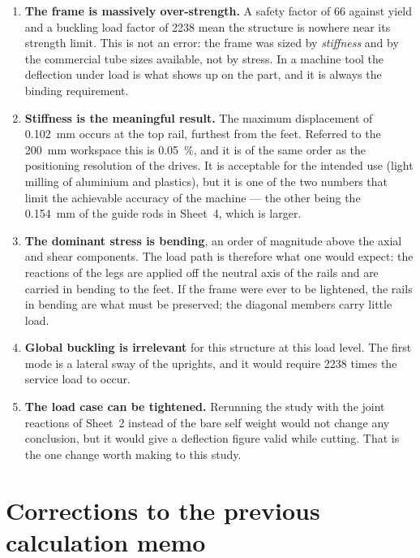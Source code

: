 \documentclass[11pt]{article}
\def\calculo{ }
\def\nombre{Group 2}
\newcommand{\sheet}[2]{\clearpage\def\calculo{#1}\def\nombre{#2}}
\begin{document}
\begin{enumerate}[leftmargin=*]
  \item \textbf{The frame is massively over-strength.} A safety factor of 66 against yield
        and a buckling load factor of 2238 mean the structure is nowhere near its strength
        limit. This is not an error: the frame was sized by \emph{stiffness} and by the
        commercial tube sizes available, not by stress. In a machine tool the deflection
        under load is what shows up on the part, and it is always the binding requirement.
  \item \textbf{Stiffness is the meaningful result.} The maximum displacement of
        \SI{0.102}{\milli\metre} occurs at the top rail, furthest from the feet. Referred
        to the \SI{200}{\milli\metre} workspace this is \SI{0.05}{\percent}, and it is of
        the same order as the positioning resolution of the drives. It is acceptable for
        the intended use (light milling of aluminium and plastics), but it is one of the
        two numbers that limit the achievable accuracy of the machine --- the other being
        the \SI{0.154}{\milli\metre} of the guide rods in Sheet~4, which is larger.
  \item \textbf{The dominant stress is bending}, an order of magnitude above the axial and
        shear components. The load path is therefore what one would expect: the reactions
        of the legs are applied off the neutral axis of the rails and are carried in
        bending to the feet. If the frame were ever to be lightened, the rails in bending
        are what must be preserved; the diagonal members carry little load.
  \item \textbf{Global buckling is irrelevant} for this structure at this load level. The
        first mode is a lateral sway of the uprights, and it would require 2238 times the
        service load to occur.
  \item \textbf{The load case can be tightened.} Rerunning the study with the joint
        reactions of Sheet~2 instead of the bare self weight would not change any
        conclusion, but it would give a deflection figure valid while cutting. That is the
        one change worth making to this study.
\end{enumerate}


\sheet{Appendix A -- Corrections}{Group 2}
\section{Corrections to the previous calculation memo}\label{sec:corrections}
\end{document}
